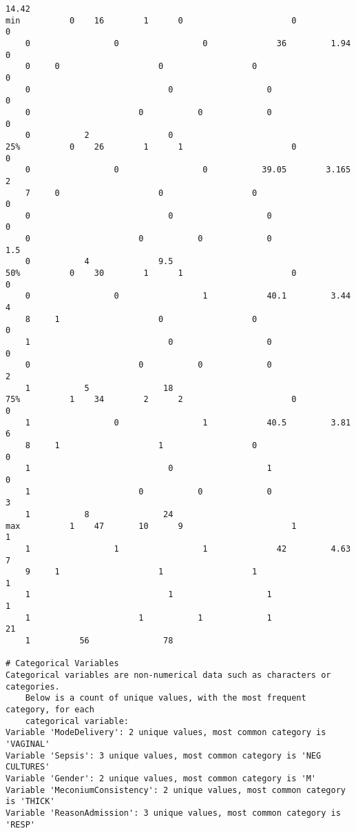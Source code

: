 \documentclass[11pt]{article}
\begin{document}
\begin{Verbatim}[tabsize=4]
	14.42
min          0    16        1      0                      0                 0
	0                 0                 0              36         1.94       0
	0     0                    0                  0                             0
	0                            0                   0                           0
	0                      0           0             0                    0
	0           2                0
25%          0    26        1      1                      0                 0
	0                 0                 0           39.05        3.165       2
	7     0                    0                  0                             0
	0                            0                   0                           0
	0                      0           0             0                  1.5
	0           4              9.5
50%          0    30        1      1                      0                 0
	0                 0                 1            40.1         3.44       4
	8     1                    0                  0                             0
	1                            0                   0                           0
	0                      0           0             0                    2
	1           5               18
75%          1    34        2      2                      0                 0
	1                 0                 1            40.5         3.81       6
	8     1                    1                  0                             0
	1                            0                   1                           0
	1                      0           0             0                    3
	1           8               24
max          1    47       10      9                      1                 1
	1                 1                 1              42         4.63       7
	9     1                    1                  1                             1
	1                            1                   1                           1
	1                      1           1             1                   21
	1          56               78

# Categorical Variables
Categorical variables are non-numerical data such as characters or categories.
	Below is a count of unique values, with the most frequent category, for each
	categorical variable:
Variable 'ModeDelivery': 2 unique values, most common category is 'VAGINAL'
Variable 'Sepsis': 3 unique values, most common category is 'NEG CULTURES'
Variable 'Gender': 2 unique values, most common category is 'M'
Variable 'MeconiumConsistency': 2 unique values, most common category is 'THICK'
Variable 'ReasonAdmission': 3 unique values, most common category is 'RESP'


\end{Verbatim}
\end{document}

